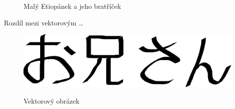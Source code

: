 \documentclass[a4paper, 11pt, hidelinks]{article}
\begin{document}
\begin{figure}[h]
{
}
\caption{Malý Etiopánek a jeho bratříček}
\label{etiopanek}
\end{figure}

\noindent Rozdíl mezi vektorovým \dots

\begin{figure}[h]
\centering
\scalebox{0.425}
{
\includegraphics{oniisan.eps}
}
\caption{Vektorový obrázek}
\label{vektorObraz}
\end{figure}
\medskip
\end{document}
